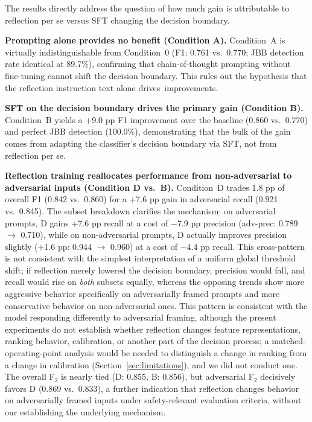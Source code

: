 \documentclass[superintelligence,article,accept,moreauthors]{Definitions/mdpi}
\renewcommand{\hl}[1]{#1}
\begin{document}
\vspace{-5pt}

The results directly address the question of how much gain is attributable to reflection \hl{per se} %
 versus SFT changing the decision boundary.

\textbf{Prompting alone provides no benefit (Condition A).}
Condition~A is virtually indistinguishable from Condition~0 (F1: 0.761 vs.\ 0.770; JBB detection rate identical at 89.7\%), confirming that chain-of-thought prompting without fine-tuning cannot shift the decision boundary. This rules out the hypothesis that the reflection instruction text alone \mbox{drives improvements.}

\textbf{SFT on the decision boundary drives the primary gain (Condition B).}
Condition~B yields a +9.0 pp F1 improvement over the baseline (0.860 vs.\ 0.770) and perfect JBB detection (100.0\%), demonstrating that the bulk of the gain comes from adapting the classifier's decision boundary via SFT, not from reflection per se.

\textbf{Reflection training reallocates performance from non-adversarial to adversarial inputs (Condition D vs.\ B).}
Condition~D trades 1.8 pp of overall F1 (0.842 vs.\ 0.860) for a +7.6 pp gain in adversarial recall (0.921 vs.\ 0.845). The subset breakdown clarifies the mechanism: on adversarial prompts, D gains +7.6 pp recall at a cost of $-$7.9 pp precision (adv-prec: 0.789 $\to$ 0.710), while on non-adversarial prompts, D actually improves precision slightly ($+$1.6 pp: 0.944 $\to$ 0.960) at a cost of $-$4.4 pp recall. This cross-pattern is not consistent with the simplest interpretation of a uniform global threshold shift; if reflection merely lowered the decision boundary, precision would fall, and recall would rise on \emph{both} subsets equally, whereas the opposing trends show more aggressive behavior specifically on adversarially framed prompts and more conservative behavior on non-adversarial ones. This pattern is consistent with the model responding differently to adversarial framing, although the present experiments do not establish whether reflection changes feature representations, ranking behavior, calibration, or another part of the decision process; a matched-operating-point analysis would be needed to distinguish a change in ranking from a change in calibration (Section~\ref{sec:limitations}), and we did not conduct one. The overall F$_2$ is nearly tied (D: 0.855, B: 0.856), but adversarial F$_2$ decisively favors D (0.869 vs.\ 0.833), a further indication that reflection changes behavior on adversarially framed inputs under safety-relevant evaluation criteria, without our establishing the underlying mechanism.
\end{document}

